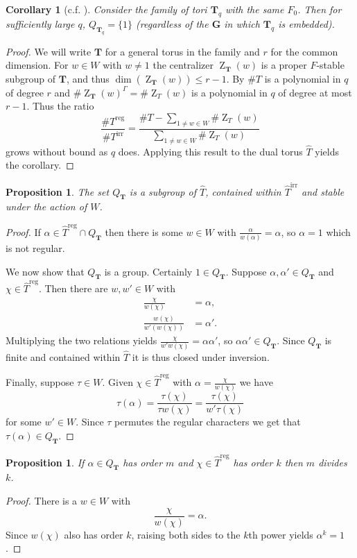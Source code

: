 \documentclass[11pt]{amsart}
\theoremstyle{plain}
\newtheorem{proposition}[theorem]{Proposition}
\newtheorem*{corollary}{Corollary}
\theoremstyle{definition}
\DeclareMathOperator{\Z}{Z}
\newcommand{\T}{\mathbf{T}}
\newcommand{\G}{\mathbf{G}}
\newcommand{\Galk}{\Gamma}
\newcommand{\hatT}{\hat{T}}
\newcommand{\Treg}{T^{\operatorname{reg}}}
\newcommand{\Threg}{\hatT^{\operatorname{reg}}}
\newcommand{\Tirr}{T^{\operatorname{irr}}}
\newcommand{\Thirr}{\hatT^{\operatorname{irr}}}
\begin{document}
\begin{corollary}[{c.f. \cite[Lemma 8.4.2]{carter}}]
Consider the family of tori $\T_q$ with the same $F_0$.  Then for sufficiently large $q$, $Q_{\T_q} = \{ 1 \}$ (regardless of the $\G$ in which $\T_q$ is embedded).
\end{corollary}
\begin{proof}
We will write $\T$ for a general torus in the family and $r$ for the common dimension.  For $w \in W$ with $w \ne 1$ the centralizer $\Z_{\T}(w)$ is a proper $F$-stable subgroup of $\T$, and thus $\dim(\Z_{\T}(w)) \le r - 1$.  By \cite[3.3.5]{carter} $\# T$ is a polynomial in $q$ of degree $r$ and $\# \Z_{\T}(w)^\Galk = \# \Z_T(w)$ is a polynomial in $q$ of degree at most $r-1$.  Thus the ratio
$$\frac{\# \Treg}{\# \Tirr} = \frac{\# T - \sum_{1 \ne w \in W} \# \Z_T(w)}{\sum_{1 \ne w \in W} \# \Z_T(w)}$$
grows without bound as $q$ does.  Applying this result to the dual torus $\hatT$ yields the corollary.
\end{proof}

\begin{proposition}
The set $Q_{\T}$ is a subgroup of $\hatT$, contained within $\Thirr$ and stable under the action of $W$.
\end{proposition}
\begin{proof}
If $\alpha \in \Threg \cap Q_{\T}$ then there is some $w \in W$ with $\frac{\alpha}{w(\alpha)} = \alpha$, so $\alpha = 1$ which is not regular.

We now show that $Q_{\T}$ is a group.  Certainly $1 \in Q_{\T}$.  Suppose $\alpha, \alpha' \in Q_{\T}$ and $\chi \in \Threg$.  Then there are $w, w' \in W$ with
\begin{align*}
\frac{\chi}{w(\chi)} &= \alpha, \\
\frac{w(\chi)}{w'(w(\chi))} &= \alpha'.
\end{align*}
Multiplying the two relations yields $\frac{\chi}{w'w(\chi)} = \alpha\alpha'$, so $\alpha\alpha' \in Q_{\T}$.  Since $Q_{\T}$ is finite and contained within $\hatT$ it is thus closed under inversion.

Finally, suppose $\tau \in W$.  Given $\chi \in \Threg$ with $\alpha = \frac{\chi}{w(\chi)}$ we have
$$\tau(\alpha) = \frac{\tau(\chi)}{\tau w(\chi)} = \frac{\tau(\chi)}{w' \tau(\chi)}$$
for some $w' \in W$.  Since $\tau$ permutes the regular characters we get that $\tau(\alpha) \in Q_{\T}$.
\end{proof}

\begin{proposition} \label{orderdiv}
If $\alpha \in Q_{\T}$ has order $m$ and $\chi \in \Threg$ has order $k$ then $m$ divides $k$.
\end{proposition}
\begin{proof}
There is a $w \in W$ with
$$\frac{\chi}{w(\chi)} = \alpha.$$
Since $w(\chi)$ also has order $k$, raising both sides to the $k$th power  yields $\alpha^k = 1$.
\end{proof}
\end{document}
